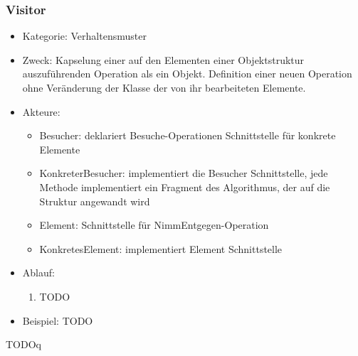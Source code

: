 \documentclass[11pt, fleqn, a4paper, leqno]{scrartcl} %
\begin{document}
		\subsubsection{Visitor}
			\begin{itemize}
				\item Kategorie: Verhaltensmuster
				\item Zweck: Kapselung einer auf den Elementen einer Objektstruktur auszuführenden Operation als ein Objekt. Definition einer neuen Operation ohne Veränderung der Klasse der von ihr bearbeiteten Elemente.
				\item Akteure: 
					\begin{itemize}
						\item Besucher: deklariert Besuche-Operationen Schnittstelle für konkrete Elemente
						\item KonkreterBesucher: implementiert die Besucher Schnittstelle, jede Methode implementiert ein Fragment des Algorithmus, der auf die Struktur angewandt wird
						\item Element: Schnittstelle für NimmEntgegen-Operation
						\item KonkretesElement: implementiert Element Schnittstelle
					\end{itemize}
				\item Ablauf:
					\begin{enumerate}
						\item TODO
					\end{enumerate}
				\item Beispiel:	 TODO		
			\end{itemize}
			TODOq
			\newpage
\end{document}
